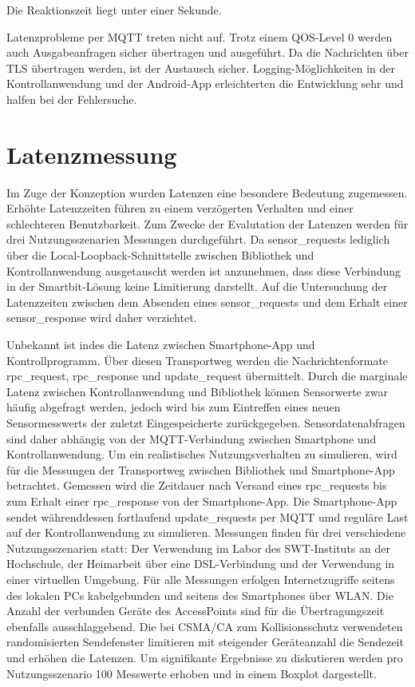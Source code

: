 \documentclass[11pt,a4paper]{report}
\begin{document}
Die Reaktionszeit liegt unter einer Sekunde.

Latenzprobleme per MQTT treten nicht auf.
Trotz einem QOS-Level 0 werden auch Ausgabeanfragen sicher übertragen und ausgeführt.
Da die Nachrichten über TLS übertragen werden, ist der Austausch sicher.
Logging-Möglichkeiten in der Kontrollanwendung und der Android-App erleichterten die Entwicklung sehr und halfen bei der Fehlersuche.


\section{Latenzmessung}
Im Zuge der Konzeption wurden Latenzen eine besondere Bedeutung zugemessen.
Erhöhte Latenzzeiten führen zu einem verzögerten Verhalten und einer schlechteren Benutzbarkeit.
Zum Zwecke der Evalutation der Latenzen werden für drei Nutzungsszenarien Messungen durchgeführt.
Da sensor\_requests lediglich über die Local-Loopback-Schnittstelle zwischen Bibliothek und Kontrollanwendung ausgetauscht werden ist anzunehmen, dass diese Verbindung in der Smartbit-Lösung keine Limitierung darstellt.
Auf die Untersuchung der Latenzzeiten zwischen dem Absenden eines sensor\_requests und dem Erhalt einer sensor\_response wird daher verzichtet.

Unbekannt ist indes die Latenz zwischen Smartphone-App und Kontrollprogramm.
Über diesen Transportweg werden die Nachrichtenformate rpc\_request, rpc\_response und update\_request übermittelt.
Durch die marginale Latenz zwischen Kontrollanwendung und Bibliothek können Sensorwerte zwar häufig abgefragt werden, jedoch wird bis zum Eintreffen eines neuen Sensormesswerts der zuletzt Eingespeicherte zurückgegeben.
Sensordatenabfragen sind daher abhängig von der MQTT-Verbindung zwischen Smartphone und Kontrollanwendung.
Um ein realistisches Nutzungsverhalten zu simulieren, wird für die Messungen der Transportweg zwischen Bibliothek und Smartphone-App betrachtet.
Gemessen wird die Zeitdauer nach Versand eines rpc\_requests bis zum Erhalt einer rpc\_response von der Smartphone-App.
Die Smartphone-App sendet währenddessen fortlaufend update\_requests per MQTT umd reguläre Last auf der Kontrollanwendung zu simulieren.
Messungen finden für drei verschiedene Nutzungsszenarien statt: Der Verwendung im Labor des SWT-Instituts an der Hochschule, der Heimarbeit über eine DSL-Verbindung und der Verwendung in einer virtuellen Umgebung.
Für alle Messungen erfolgen Internetzugriffe seitens des lokalen PCs kabelgebunden und seitens des Smartphones über WLAN.
Die Anzahl der verbunden Geräte des AccessPoints sind für die Übertragungszeit ebenfalls ausschlaggebend.
Die bei CSMA/CA zum Kollisionsschutz verwendeten randomisierten Sendefenster limitieren mit steigender Geräteanzahl die Sendezeit und erhöhen die Latenzen.
Um signifikante Ergebnisse zu diskutieren werden pro Nutzungsszenario 100 Messwerte erhoben und in einem Boxplot dargestellt.
\end{document}
